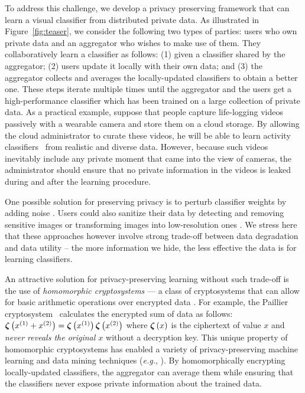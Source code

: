 \documentclass[10pt,twocolumn,letterpaper]{article}
\def\vct#1{\mbox{\boldmath $#1$}}
\def\eg{{\it e.g.}}
\def\ui#1{^{(#1)}}
\def\he#1{\vct{\zeta}\left(#1\right)}
\begin{document}
To address this challenge, we develop a privacy preserving framework that can learn a visual classifier from distributed private data. As illustrated in Figure~\ref{fig:teaser}, we consider the following two types of parties: users who own private data and an aggregator who wishes to make use of them. They collaboratively learn a classifier as follows: (1) given a classifier shared by the aggregator; (2) users update it locally with their own data; and (3) the aggregator collects and averages the locally-updated classifiers to obtain a better one. These steps iterate multiple times until the aggregator and the users get a high-performance classifier which has been trained on a large collection of private data. As a practical example, suppose that people capture life-logging videos passively with a wearable camera and store them on a cloud storage. By allowing the cloud administrator to curate these videos, he will be able to learn activity classifiers~\cite{Fan2016a,Fathi2012,Lee2015,Pirsiavash2012,Ryoo2013,Singh2016} from realistic and diverse data. However, because such videos inevitably include any private moment that came into the view of cameras, the administrator should ensure that no private information in the videos is leaked during and after the learning procedure.

One possible solution for preserving privacy is to perturb classifier weights by adding noise \cite{Pathak2010a,Rajkumar2012a}. Users could also sanitize their data by detecting and removing sensitive images \cite{Fan2016a,Korayem2016a,Templeman2014a} or transforming images into low-resolution ones \cite{Ryoo2017a}. We stress here that these approaches however involve strong trade-off between data degradation and data utility -- the more information we hide, the less effective the data is for learning classifiers. 

An attractive solution for privacy-preserving learning without such trade-off is the use of \emph{homomorphic cryptosystems} --- a class of cryptosystems that can allow for basic arithmetic operations over encrypted data \cite{Fontaine2007a}. For example, the Paillier cryptosystem~\cite{Paillier1999a} calculates the encrypted sum of data as follows: $\he{x\ui{1} + x\ui{2}}=\he{x\ui{1}}\he{x\ui{2}}$ where $\he{x}$ is the ciphertext of value $x$ and \emph{never reveals the original $x$} without a decryption key. This unique property of homomorphic cryptosystems has enabled a variety of privacy-preserving machine learning and data mining techniques (\eg, \cite{Bost2015a,Dowlin2016a,Graepel2012,Pathak2010a,Takabi2016a,Yuan2014a}). By homomorphically encrypting locally-updated classifiers, the aggregator can average them while ensuring that the classifiers never expose private information about the trained data.
\end{document}
